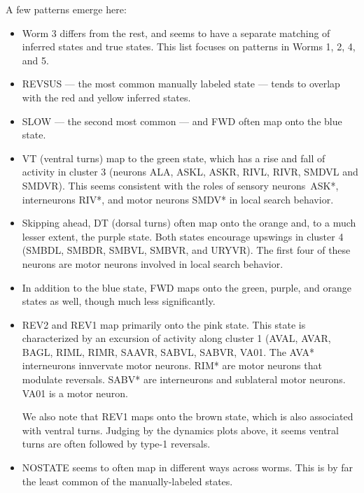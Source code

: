 \documentclass{article}
\begin{document}
A few patterns emerge here:
\begin{itemize}
\item Worm 3 differs from the rest, and seems to have a separate
  matching of inferred states and true states.  This list focuses
  on patterns in Worms 1, 2, 4, and 5. 
\item \textsf{REVSUS} --- the most common manually labeled state ---
  tends to overlap with the red and yellow inferred states.
\item \textsf{SLOW} --- the second most common --- and \textsf{FWD}
  often map onto the blue state.
\item \textsf{VT} (ventral turns) map to the green state, which
  has a rise and fall of activity in cluster 3 (neurons
  {\sf ALA, ASKL, ASKR, RIVL, RIVR, SMDVL} and \textsf{SMDVR}).
  This seems consistent with the roles of sensory neurons~\textsf{ASK*},
  interneurons \textsf{RIV*}, and motor neurons \textsf{SMDV*} in
  local search behavior.
\item Skipping ahead, \textsf{DT} (dorsal turns) often map onto
  the orange and, to a much lesser extent, the purple state. Both
  states encourage upswings in cluster 4 ({\sf SMBDL, SMBDR, SMBVL, SMBVR}, and \textsf{URYVR}).
  The first four of these neurons are motor neurons involved in
  local search behavior. 
\item In addition to the blue state, \textsf{FWD} maps onto the
  green, purple, and orange states as well, though much less significantly.
\item \textsf{REV2} and \textsf{REV1} map primarily onto the pink state.
  This state is characterized by an excursion of activity along cluster
  1 ({\sf AVAL, AVAR, BAGL, RIML, RIMR, SAAVR, SABVL, SABVR, VA01}.
  The \textsf{AVA*} interneurons innvervate motor neurons.
  \textsf{RIM*} are motor neurons that modulate reversals.
  \textsf{SABV*} are interneurons and sublateral motor neurons.
  \textsf{VA01} is a motor neuron.

  We also note that \textsf{REV1} maps onto the brown state, which
  is also associated with ventral turns. Judging by the dynamics plots above,
  it seems ventral turns are often followed by type-1 reversals.
\item \textsf{NOSTATE} seems to often map in different ways across worms.
  This is by far the least common of the manually-labeled states.
\end{itemize}

\end{document}
